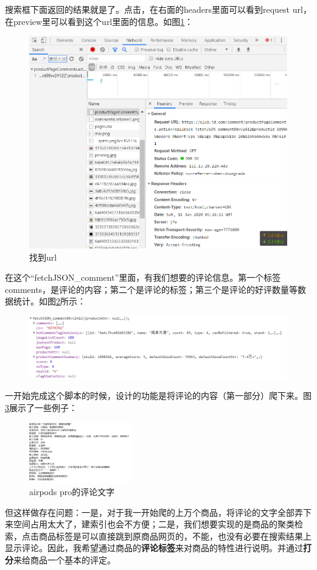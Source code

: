 搜索框下面返回的结果就是了。点击，在右面的headers里面可以看到request url，在preview里可以看到这个url里面的信息。如图\ref{img:yhb4}：
\begin{figure}[htbp]
\centering
\includegraphics[width=13.5cm]{img/yhb/find_url_jd.png}
\caption{找到url} %
\label{img:yhb4}   %
\end{figure}

在这个“fetchJSON\_comment”里面，有我们想要的评论信息。第一个标签comments，是评论的内容；第二个是评论的标签；第三个是评论的好评数量等数据统计。如图\ref{img:yhb5}所示：
\begin{figure}[htbp]
\centering
\includegraphics[width=13.5cm]{img/yhb/json_items_jd.png}
\label{img:yhb5}   %
\end{figure}



一开始完成这个脚本的时候，设计的功能是将评论的内容（第一部分）爬下来。图\ref{img:yhb6}展示了一些例子：
\begin{figure}[htbp]
\centering
\includegraphics[width=4.5cm]{img/yhb/cmt_contents_eg_jd.png}
\caption{airpods pro的评论文字} %
\label{img:yhb6}   %
\end{figure}
但这样做存在问题：一是，对于我一开始爬的上万个商品，将评论的文字全部弄下来空间占用太大了，建索引也会不方便；二是，我们想要实现的是商品的聚类检索，点击商品标签是可以直接跳到原商品网页的，不能，也没有必要在搜索结果上显示评论。因此，我希望通过商品的\textbf{评论标签}来对商品的特性进行说明。并通过\textbf{打分}来给商品一个基本的评定。

